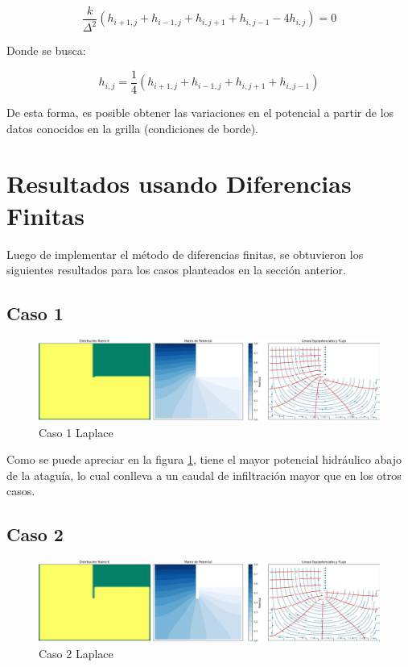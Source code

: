 \begin{equation}
    \frac{k}{\Delta^2}(h_{i+1,j} + h_{i-1,j} + h_{i,j+1} + h_{i,j-1} - 4h_{i,j}) = 0
\end{equation}

Donde se busca:

\begin{equation}
    h_{i,j} = \frac{1}{4}(h_{i+1,j} + h_{i-1,j} + h_{i,j+1} + h_{i,j-1})
\end{equation}

De esta forma, es posible obtener las variaciones en el potencial a partir de los datos conocidos en la grilla (condiciones de borde).

\newpage

\section{Resultados usando Diferencias Finitas}
Luego de implementar el método de diferencias finitas, se obtuvieron los siguientes resultados para los casos planteados en la sección anterior.
\subsection{Caso 1}

\begin{figure}[H]
    \centering
    \includegraphics[width=\textwidth]{GRAFICOS/laplace_caso_1.jpg}
    \caption{Caso 1 Laplace}
    \label{fig:laplace_caso_1}
\end{figure}

Como se puede apreciar en la figura \ref{fig:laplace_caso_1}, tiene el mayor potencial hidráulico abajo de la ataguía, lo cual conlleva a un caudal de infiltración mayor que en los otros casos.

\subsection{Caso 2}

\begin{figure}[H]
    \centering
    \includegraphics[width=\textwidth]{GRAFICOS/laplace_caso_2.jpg}
    \caption{Caso 2 Laplace}
    \label{fig:laplace_caso_2}
\end{figure}

